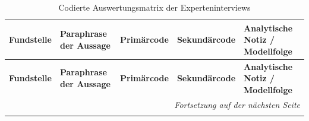 \begingroup
\tiny
\renewcommand{\arraystretch}{1.05}
\setlength{\LTleft}{-1.0cm}
\setlength{\LTright}{0pt}

\begin{longtable}{p{0.9cm} p{6cm} p{0.9cm} p{0.9cm} p{6cm}}
\caption{Codierte Auswertungsmatrix der Experteninterviews}
\label{tab:codierte-auswertungsmatrix}\\

\toprule
\textbf{Fundstelle} & \textbf{Paraphrase der Aussage} & \textbf{Primär\-code} & \textbf{Sekun\-där\-code} & \textbf{Analytische Notiz / Modellfolge} \\
\midrule
\endfirsthead

\toprule
\textbf{Fundstelle} & \textbf{Paraphrase der Aussage} & \textbf{Primär\-code} & \textbf{Sekun\-där\-code} & \textbf{Analytische Notiz / Modellfolge} \\
\midrule
\endhead

\midrule
\multicolumn{5}{r}{\textit{Fortsetzung auf der nächsten Seite}} \\
\midrule
\endfoot

\bottomrule
\endlastfoot


\end{longtable}
